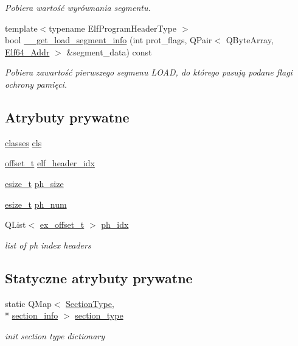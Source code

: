 \begin{DoxyCompactItemize}
\begin{DoxyCompactList}\small\item\em Pobiera wartość wyrównania segmentu. \end{DoxyCompactList}\item 
{\footnotesize template$<$typename Elf\-Program\-Header\-Type $>$ }\\bool \hyperlink{class_e_l_f_a95a0568b7b58105b79a1fca972335b02}{\-\_\-\-\_\-get\-\_\-load\-\_\-segment\-\_\-info} (int prot\-\_\-flags, Q\-Pair$<$ Q\-Byte\-Array, \hyperlink{elf_8h_aeed51d08e3a950d637f8ec1f0cd4ef65}{Elf64\-\_\-\-Addr} $>$ \&segment\-\_\-data) const 
\begin{DoxyCompactList}\small\item\em Pobiera zawartość pierwszego segmenu L\-O\-A\-D, do którego pasują podane flagi ochrony pamięci. \end{DoxyCompactList}\end{DoxyCompactItemize}
\subsection*{Atrybuty prywatne}
\begin{DoxyCompactItemize}
\item 
\hyperlink{class_e_l_f_a8ac9a5a7e999db1f2f11ab21bb31f5f8}{classes} \hyperlink{class_e_l_f_a161d6f6b6c2cf90eac0fc68c9c71b2c0}{cls}
\item 
\hyperlink{elffile_8h_a5883b60eda35e8f8d370ececc9f820ef}{offset\-\_\-t} \hyperlink{class_e_l_f_abf3b4ff3bf04249f73a62c5819beddd1}{elf\-\_\-header\-\_\-idx}
\item 
\hyperlink{elffile_8h_a893a6f75ff12b6fb48772f3afb8f1d7d}{esize\-\_\-t} \hyperlink{class_e_l_f_ad3d418d35d3688f21989b20ae4e8c7d6}{ph\-\_\-size}
\item 
\hyperlink{elffile_8h_a893a6f75ff12b6fb48772f3afb8f1d7d}{esize\-\_\-t} \hyperlink{class_e_l_f_a407fa88b371e09b518d519f5614da5ba}{ph\-\_\-num}
\item 
Q\-List$<$ \hyperlink{elffile_8h_aa2125ab7570efd47d79e62488cfe0207}{ex\-\_\-offset\-\_\-t} $>$ \hyperlink{class_e_l_f_a66548f1b1a7f91f5c784cb684493f75e}{ph\-\_\-idx}
\begin{DoxyCompactList}\small\item\em list of ph index headers \end{DoxyCompactList}\end{DoxyCompactItemize}
\subsection*{Statyczne atrybuty prywatne}
\begin{DoxyCompactItemize}
\item 
static Q\-Map$<$ \hyperlink{class_e_l_f_abaebdfb7048441e430684d68df8d73d1}{Section\-Type}, \\*
\hyperlink{class_e_l_f_a453c51d672396e7f5f328153f55e94bc}{section\-\_\-info} $>$ \hyperlink{class_e_l_f_a083e9dd23053d80114879323b38927cc}{section\-\_\-type}
\begin{DoxyCompactList}\small\item\em init section type dictionary \end{DoxyCompactList}\end{DoxyCompactItemize}
